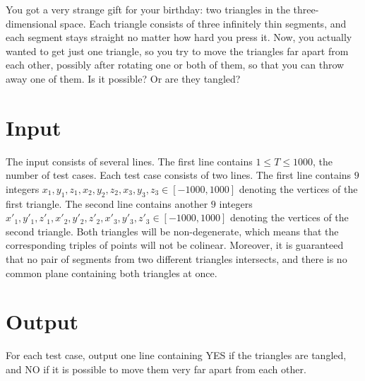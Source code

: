 
You got a very strange gift for your birthday: two triangles in the three-dimensional space. Each triangle consists of three infinitely thin segments, and each segment stays straight
no matter how hard you press it. Now, you actually wanted to get just one triangle, so you try to move the triangles far apart from each other, possibly after rotating one or both of them,
so that you can throw away one of them. Is it possible? Or are they tangled?

\section*{Input}
The input consists of several lines. The first line contains $1\le T\le 1000$, the number of test cases.
Each test case consists of two lines. The first line contains $9$ integers $x_1,y_1,z_1,x_2,y_2,z_2,x_3,y_3,z_3 \in [-1000,1000]$ denoting the vertices of the first triangle.
The second line contains another $9$ integers $x'_1,y'_1,z'_1,x'_2,y'_2,z'_2,x'_3,y'_3,z'_3 \in [-1000,1000]$ denoting the vertices of the second triangle.
Both triangles will be non-degenerate, which means that the corresponding triples of points will not be colinear. Moreover, it is guaranteed that no pair of segments
from two different triangles intersects, and there is no common plane containing both triangles at once.

\section*{Output}
For each test case, output one line containing YES if the triangles are tangled, and NO if it is possible to move them very far apart from each other.
